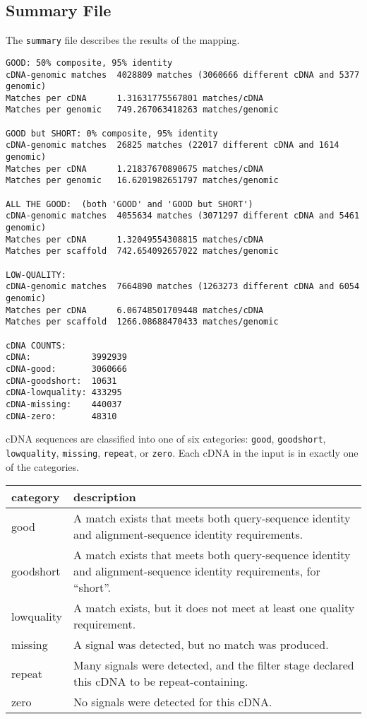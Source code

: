 \documentclass[twoside,11pt]{book}
\begin{document}
\subsection{Summary File}
\label{sec:summary}

The {\tt summary} file describes the results of the mapping.

\footnotesize
\begin{verbatim}
GOOD: 50% composite, 95% identity
cDNA-genomic matches  4028809 matches (3060666 different cDNA and 5377 genomic)
Matches per cDNA      1.31631775567801 matches/cDNA
Matches per genomic   749.267063418263 matches/genomic

GOOD but SHORT: 0% composite, 95% identity
cDNA-genomic matches  26825 matches (22017 different cDNA and 1614 genomic)
Matches per cDNA      1.21837670890675 matches/cDNA
Matches per genomic   16.6201982651797 matches/genomic

ALL THE GOOD:  (both 'GOOD' and 'GOOD but SHORT')
cDNA-genomic matches  4055634 matches (3071297 different cDNA and 5461 genomic)
Matches per cDNA      1.32049554308815 matches/cDNA
Matches per scaffold  742.654092657022 matches/genomic

LOW-QUALITY:
cDNA-genomic matches  7664890 matches (1263273 different cDNA and 6054 genomic)
Matches per cDNA      6.06748501709448 matches/cDNA
Matches per scaffold  1266.08688470433 matches/genomic

cDNA COUNTS:
cDNA:            3992939
cDNA-good:       3060666
cDNA-goodshort:  10631
cDNA-lowquality: 433295
cDNA-missing:    440037
cDNA-zero:       48310
\end{verbatim}
\normalsize

cDNA sequences are classified into one of six categories: {\tt good},
{\tt goodshort}, {\tt lowquality}, {\tt missing}, {\tt repeat}, or
{\tt zero}.  Each cDNA in the input is in exactly one of the
categories.

\begin{tabular}{|l|p{4.3in}|}
\hline
category   & description \\
\hline
\hline
good       & A match exists that meets both query-sequence identity and alignment-sequence identity requirements. \\
goodshort  & A match exists that meets both query-sequence identity and alignment-sequence identity requirements, for ``short''. \\
lowquality & A match exists, but it does not meet at least one quality requirement. \\
missing    & A signal was detected, but no match was produced. \\
repeat     & Many signals were detected, and the filter stage declared this cDNA to be repeat-containing. \\
zero       & No signals were detected for this cDNA. \\
\hline
\end{tabular}
\end{document}
